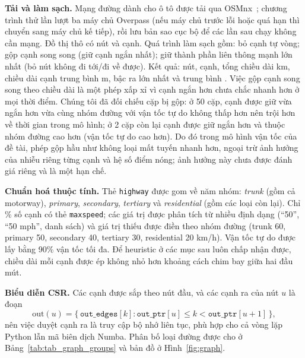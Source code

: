 \textbf{Tải và làm sạch.} Mạng đường dành cho ô tô được tải qua OSMnx~\cite{boeing2017}; chương trình thử lần lượt ba máy
chủ Overpass (nếu máy chủ trước lỗi hoặc quá hạn thì chuyển sang máy chủ kế tiếp), rồi lưu
bản sao cục bộ để các lần sau chạy không cần mạng. Đồ thị thô có \RawNodes{} nút và \RawEdges{} cạnh. Quá trình làm sạch
gồm: bỏ \SelfLoops{} cạnh tự vòng; gộp \ParallelEdges{} cạnh song song (giữ cạnh ngắn nhất); giữ thành phần liên thông
mạnh lớn nhất (bỏ \DroppedNodes{} nút không đi tới/đi về được). Kết quả: \NNodes{} nút, \NEdges{} cạnh, tổng chiều dài
\TotalKm{} km, chiều dài cạnh trung bình \MeanEdgeLen{} m, bậc ra lớn nhất \MaxOutDeg{} và trung bình \MeanOutDeg.
Việc gộp cạnh song song theo chiều dài là một phép xấp xỉ vì cạnh ngắn hơn chưa chắc nhanh hơn ở mọi thời điểm. Chúng tôi đã đối
chiếu \ParallelEdges{} cặp bị gộp: ở 50 cặp, cạnh được giữ vừa ngắn hơn vừa cùng nhóm đường với vận tốc tự do không thấp hơn nên
trội hơn về thời gian trong mô hình; ở 2 cặp còn lại cạnh được giữ ngắn hơn và thuộc nhóm đường cao hơn (vận tốc tự do cao
hơn). Do đó trong mô hình vận tốc của đề tài, phép gộp hầu như không loại mất tuyến nhanh hơn, ngoại trừ ảnh hưởng của nhiễu
riêng từng cạnh và hệ số điểm nóng; ảnh hưởng này chưa được đánh giá riêng và là một hạn chế.

\textbf{Chuẩn hoá thuộc tính.} Thẻ \texttt{highway} được gom về năm nhóm: \emph{trunk} (gồm cả motorway), \emph{primary},
\emph{secondary}, \emph{tertiary} và \emph{residential} (gồm các loại còn lại). Chỉ \MaxspeedCoverage\% số cạnh có thẻ
\texttt{maxspeed}; các giá trị được phân tích từ nhiều định dạng (``50'', ``50 mph'', danh sách) và giá trị thiếu được điền
theo nhóm đường (trunk 60, primary 50, secondary 40, tertiary 30, residential 20 km/h). Vận tốc tự do được lấy bằng 90\%
vận tốc tối đa. Để heuristic ở các mục sau luôn chấp nhận được, chiều dài mỗi cạnh được ép không nhỏ hơn khoảng cách chim
bay giữa hai đầu mút.

\textbf{Biểu diễn CSR.} Các cạnh được sắp theo nút đầu, và các cạnh ra của nút $u$ là đoạn
\begin{equation}
\text{out}(u) = \bigl\{\,\texttt{out\_edges}[k] : \texttt{out\_ptr}[u] \le k < \texttt{out\_ptr}[u+1]\,\bigr\},
\label{eq:csr}
\end{equation}
nên việc duyệt cạnh ra là truy cập bộ nhớ liên tục, phù hợp cho cả vòng lặp Python lẫn mã biên dịch Numba. Phân bố loại
đường được cho ở Bảng~\ref{tab:tab_graph_groups} và bản đồ ở Hình~\ref{fig:graph}.



